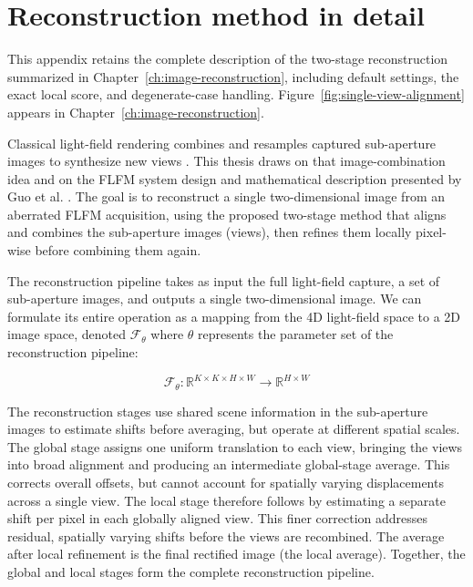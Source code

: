 \chapter{Reconstruction method in detail}
\label{app:reconstruction-method}

This appendix retains the complete description of the two-stage reconstruction summarized in Chapter~\ref{ch:image-reconstruction}, including default settings, the exact local score, and degenerate-case handling. Figure~\ref{fig:single-view-alignment} appears in Chapter~\ref{ch:image-reconstruction}.

\begingroup
\raggedbottom

Classical light-field rendering combines and resamples captured sub-aperture images to synthesize new views \cite{levoyHanrahan1996lightFieldRendering}. This thesis draws on that image-combination idea and on the FLFM system design and mathematical description presented by Guo et al. \cite{guo2019fourierLightField}. The goal is to reconstruct a single two-dimensional image from an aberrated FLFM acquisition, using the proposed two-stage method that aligns and combines the sub-aperture images (views), then refines them locally pixel-wise before combining them again.

The reconstruction pipeline takes as input the full light-field capture, a set of sub-aperture images, and outputs a single two-dimensional image. We can formulate its entire operation as a mapping from the 4D light-field space to a 2D image space, denoted $\mathcal{F}_{\theta}$ where $\theta$ represents the parameter set of the reconstruction pipeline:

\begin{equation}
    \mathcal{F}_{\theta}: \mathbb{R} ^{K \times K \times H \times W } \rightarrow \mathbb{R} ^{H \times W}
\end{equation}

The reconstruction stages use shared scene information in the sub-aperture images to estimate shifts before averaging, but operate at different spatial scales. The global stage assigns one uniform translation to each view, bringing the views into broad alignment and producing an intermediate global-stage average. This corrects overall offsets, but cannot account for spatially varying displacements across a single view. The local stage therefore follows by estimating a separate shift per pixel in each globally aligned view. This finer correction addresses residual, spatially varying shifts before the views are recombined. The average after local refinement is the final rectified image (the local average). Together, the global and local stages form the complete reconstruction pipeline.

